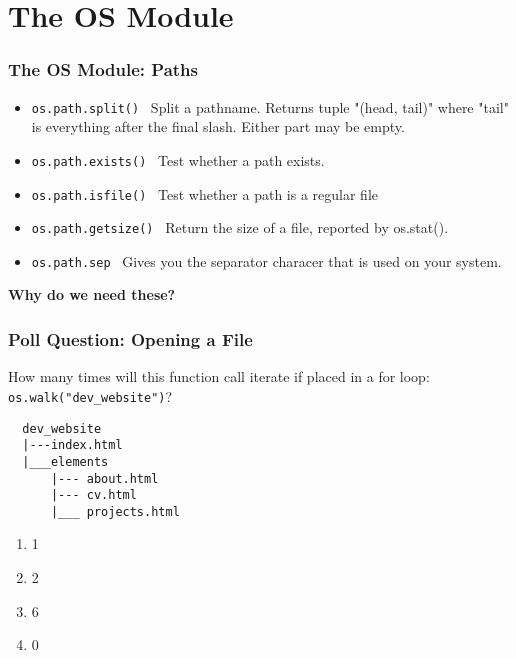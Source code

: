 \documentclass{beamer}
\begin{document}
\section{The OS Module}
\begin{frame}[fragile]
  \frametitle{The OS Module: Paths}
  \begin{itemize}
    \item \lstinline|os.path.split()| \textrightarrow \ Split a pathname.  Returns tuple "(head, tail)" where "tail" is everything after the final slash.  Either part may be empty.
    \item \lstinline|os.path.exists()| \textrightarrow \ Test whether a path exists.  
    \item \lstinline|os.path.isfile()| \textrightarrow \ Test whether a path is a regular file
    \item \lstinline|os.path.getsize()| \textrightarrow \ Return the size of a file, reported by os.stat().
    \item \lstinline|os.path.sep| \textrightarrow \ Gives you the separator characer that is used on your system.
  \end{itemize}
  \vfill
  \pause
  \textbf{Why do we need these?}
\end{frame}

\begin{frame}[fragile]
  \frametitle{Poll Question: Opening a File}
  How many times will this function call iterate if placed in a for loop: \lstinline|os.walk("dev_website")|?
  \begin{lstlisting}
  dev_website
  |---index.html
  |___elements
      |--- about.html
      |--- cv.html
      |___ projects.html
  \end{lstlisting} 
  \vfill
  \begin{enumerate}[A]
    \item 1
    \item 2
    \item 6
    \item 0
  \end{enumerate}
\end{frame}

%
%
\end{document}
